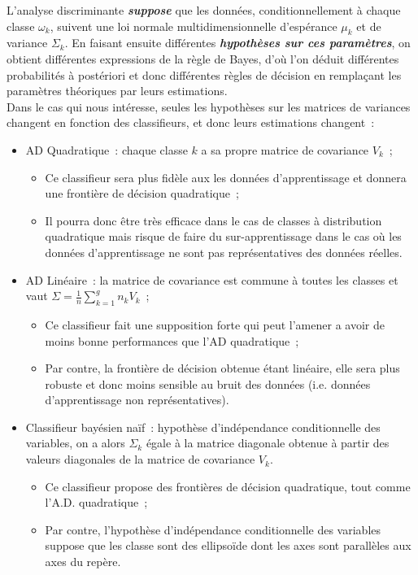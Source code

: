 \documentclass[a4paper,10pt]{report}
\begin{document}
L'analyse discriminante \textbf{\textit{suppose}} que les données, conditionnellement à chaque classe $\omega_k$, suivent une loi normale multidimensionnelle d'espérance $\mu_k$ et de variance $\Sigma_k$. En faisant ensuite différentes \textbf{\textit{hypothèses sur ces paramètres}}, on obtient différentes expressions de la règle de Bayes, d'où l'on déduit différentes probabilités à postériori et donc différentes règles de décision en remplaçant les paramètres théoriques par leurs estimations.\\
Dans le cas qui nous intéresse, seules les hypothèses sur les matrices de variances changent en fonction des classifieurs, et donc leurs estimations changent~:
\begin{itemize}
	\item AD Quadratique~: chaque classe $k$ a sa propre matrice de covariance $V_k$~;
	\begin{itemize}
		\item Ce classifieur sera plus fidèle aux les données d'apprentissage et donnera une frontière de décision quadratique~;
		\item Il pourra donc être très efficace dans le cas de classes à distribution quadratique mais risque de faire du sur-apprentissage dans le cas où les données d'apprentissage ne sont pas représentatives des données réelles.
	\end{itemize}
	\item AD Linéaire~: la matrice de covariance est commune à toutes les classes et vaut $\Sigma = \frac{1}{n} \sum_{k=1}^{g} n_k V_k$~;
	\begin{itemize}
		\item Ce classifieur fait une supposition forte qui peut l'amener a avoir de moins bonne performances que l'AD quadratique~;
		\item Par contre, la frontière de décision obtenue étant linéaire, elle sera plus robuste et donc moins sensible au bruit des données (i.e. données d'apprentissage non représentatives).
	\end{itemize}
	\item Classifieur bayésien naïf~: hypothèse d'indépendance conditionnelle des variables, on a alors $\Sigma_k$ égale à la matrice diagonale obtenue à partir des valeurs diagonales de la matrice de covariance $V_k$.
	\begin{itemize}
		\item Ce classifieur propose des frontières de décision quadratique, tout comme l'A.D. quadratique~;
		\item Par contre, l'hypothèse d'indépendance conditionnelle des variables suppose que les classe sont des ellipsoïde dont les axes sont parallèles aux axes du repère.
	\end{itemize}
\end{itemize}
\end{document}
